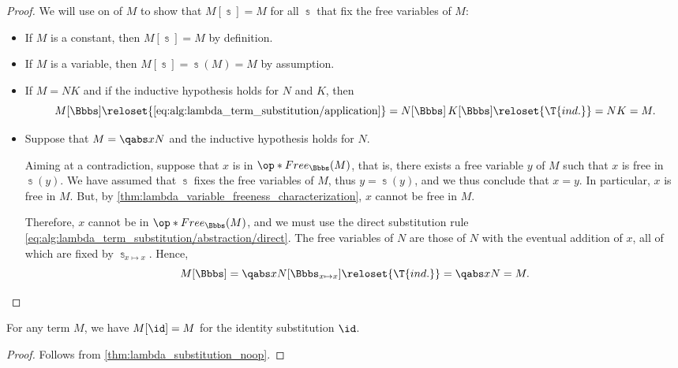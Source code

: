 \begin{proof}
  \NecessitySubProof We will use  on of \( M \) to show that \( M[\Bbbs] = M \) for all \( \Bbbs \) that fix the free variables of \( M \):
  \begin{itemize}
    \item If \( M \) is a constant, then \( M[\Bbbs] = M \) by definition.
    \item If \( M \) is a variable, then \( M[\Bbbs] = \Bbbs(M) = M \) by assumption.
    \item If \( M = NK \) and if the inductive hypothesis holds for \( N \) and \( K \), then
    \begin{equation*}
      M[\Bbbs]
      \reloset {\eqref{eq:alg:lambda_term_substitution/application}} =
      N[\Bbbs] \thinspace K[\Bbbs]
      \reloset {\T{ind.}} =
      N K
      =
      M.
    \end{equation*}

    \item Suppose that \( M = \qabs x N \) and the inductive hypothesis holds for \( N \).

    Aiming at a contradiction, suppose that \( x \) is in \( \op*{Free}_\Bbbs(M) \), that is, there exists a free variable \( y \) of \( M \) such that \( x \) is free in \( \Bbbs(y) \). We have assumed that \( \Bbbs \) fixes the free variables of \( M \), thus \( y = \Bbbs(y) \), and we thus conclude that \( x = y \). In particular, \( x \) is free in \( M \). But, by \cref{thm:lambda_variable_freeness_characterization}, \( x \) cannot be free in \( M \).

    Therefore, \( x \) cannot be in \( \op*{Free}_\Bbbs(M) \), and we must use the direct substitution rule \eqref{eq:alg:lambda_term_substitution/abstraction/direct}. The free variables of \( N \) are those of \( N \) with the eventual addition of \( x \), all of which are fixed by \( \Bbbs_{x \mapsto x} \). Hence,
    \begin{equation*}
      M[\Bbbs]
      =
      \qabs x N[\Bbbs_{x \mapsto x}]
      \reloset {\T{ind.}} =
      \qabs x N
      =
      M.
    \end{equation*}
  \end{itemize}
\end{proof}

\begin{corollary}\label{thm:lambda_substitution_identity}
  For any term \( M \), we have \( M[\id] = M \) for the identity substitution \( \id \).
\end{corollary}
\begin{proof}
  Follows from \cref{thm:lambda_substitution_noop}.
\end{proof}

